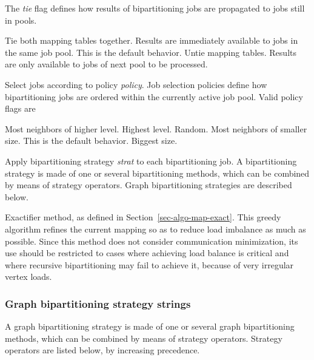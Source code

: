 \begin{itemize}
\begin{itemize}
\begin{itemize}
\end{itemize}
\iteme[{\tt map=}{\it tie}]
The {\it tie\/} flag defines how results of bipartitioning jobs are
propagated to jobs still in pools.
\begin{itemize}
\iteme[{\tt t}]
Tie both mapping tables together. Results are immediately available to jobs
in the same job pool. This is the default behavior.
\iteme[{\tt u}]
Untie mapping tables. Results are only available to jobs of next pool to be
processed.
\end{itemize}
\iteme[{\tt poli=}{\it policy}]
Select jobs according to policy {\it policy}. Job selection policies
define how bipartitioning jobs are ordered within the currently active job
pool. Valid policy flags are
\begin{itemize}
\iteme[{\tt L}]
Most neighbors of higher level.
\iteme[{\tt l}]
Highest level.
\iteme[{\tt r}]
Random.
\iteme[{\tt S}]
Most neighbors of smaller size. This is the default behavior.
\iteme[{\tt s}]
Biggest size.
\end{itemize}
\iteme[{\tt sep=}{\it strat}]
Apply bipartitioning strategy {\it strat\/} to each bipartitioning job.
A bipartitioning strategy is made of one or several bipartitioning methods,
which can be combined by means of strategy operators. Graph
bipartitioning strategies are described below.
\end{itemize}
\iteme[{\tt x}]
Exactifier method, as defined in Section~\ref{sec-algo-map-exact}.
This greedy algorithm refines the current mapping so as to reduce load
imbalance as much as possible. Since this method does not consider
communication minimization, its use should be restricted to cases
where achieving load balance is critical and where recursive
bipartitioning may fail to achieve it, because of very irregular
vertex loads.
\end{itemize}

\subsubsection{Graph bipartitioning strategy strings}
\label{sec-lib-format-bipart}

A graph bipartitioning strategy is made of one or several graph
bipartitioning methods, which can be combined by means of strategy
operators. Strategy operators are listed below, by increasing
precedence.

